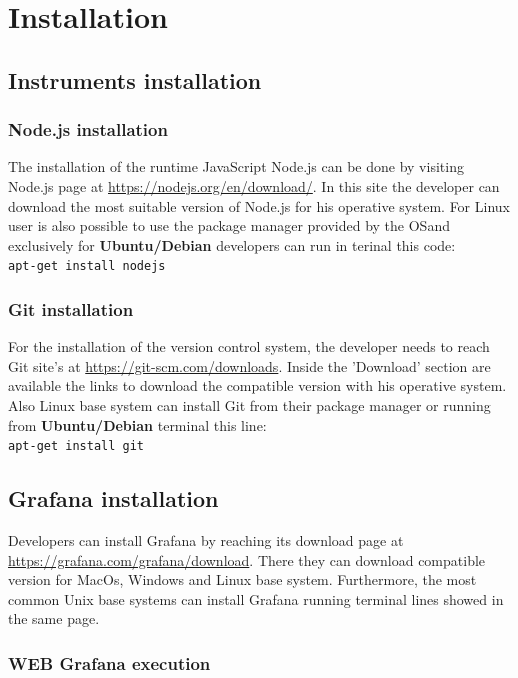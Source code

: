\section{Installation}

\subsection{Instruments installation}

\subsubsection{Node.js installation}
The installation of the runtime JavaScript Node.js can be done by visiting  Node.js page at \url{https://nodejs.org/en/download/}. In this site the developer can download the most suitable version of Node.js for his operative system. For Linux user is also possible to use the package manager provided by the OS\glo and exclusively for \textbf{Ubuntu/Debian} developers can run in terinal this code:\\
\texttt{apt-get install nodejs} \\

\subsubsection{Git installation}
For the installation of the version control system, the developer needs to reach Git site's at \url{https://git-scm.com/downloads}. Inside the 'Download' section are available the links to download the compatible version with his operative system. Also Linux base system  can install Git from their package manager or running from \textbf{Ubuntu/Debian} terminal this line:\\
\texttt{apt-get install git} \\

\subsection{Grafana installation}
Developers can install Grafana by reaching its download page at \url{https://grafana.com/grafana/download}. There they can download compatible version for MacOs, Windows and Linux base system. Furthermore, the most common Unix base systems can install Grafana running terminal lines showed in the same page.

\subsubsection{WEB Grafana execution}

